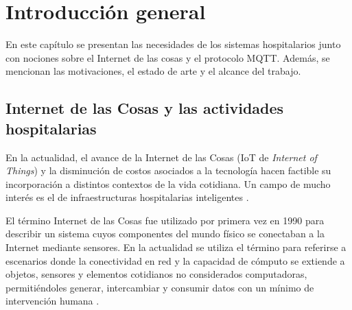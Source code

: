 
\chapter{Introducción general} %

\label{Chapter1} %
\label{IntroGeneral}
En este capítulo se presentan las necesidades de los sistemas hospitalarios junto con nociones sobre el Internet de las cosas y el protocolo MQTT. Además, se mencionan las motivaciones, el estado de arte y el alcance del trabajo.

\newcommand{\keyword}[1]{\textbf{#1}}
\newcommand{\tabhead}[1]{\textbf{#1}}
\newcommand{\code}[1]{\texttt{#1}}
\newcommand{\file}[1]{\texttt{\bfseries#1}}
\newcommand{\option}[1]{\texttt{\itshape#1}}
\newcommand{\grados}{$^{\circ}$}



\section{Internet de las Cosas y las actividades hospitalarias}
\label{sec:Internet de las Cosas y las actividades hospitalarias}

En la actualidad, el avance de la Internet de las Cosas (IoT de \textit{Internet of Things}) y la disminución de costos asociados a la tecnología hacen factible su incorporación a distintos contextos de la vida cotidiana. Un campo de mucho interés es el de infraestructuras hospitalarias inteligentes \citep{ARTICLE:1}.

El término Internet de las Cosas fue utilizado por primera vez en 1990 para describir un sistema cuyos componentes del mundo físico se conectaban a la Internet mediante sensores. En la actualidad se utiliza el término para referirse a escenarios donde la conectividad en red y la capacidad de cómputo se extiende a objetos, sensores y elementos cotidianos no considerados computadoras, permitiéndoles generar, intercambiar y consumir datos con un mínimo de intervención humana \citep{ARTICLE:3}.

